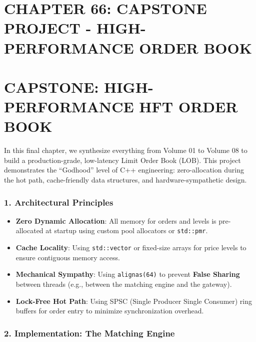 \hypertarget{chapter-66-capstone-project---high-performance-order-book}{%
\section{CHAPTER 66: CAPSTONE PROJECT - HIGH-PERFORMANCE ORDER
BOOK}\label{chapter-66-capstone-project---high-performance-order-book}}

\hypertarget{capstone-high-performance-hft-order-book}{%
\section{CAPSTONE: HIGH-PERFORMANCE HFT ORDER
BOOK}\label{capstone-high-performance-hft-order-book}}

In this final chapter, we synthesize everything from Volume 01 to Volume
08 to build a production-grade, low-latency Limit Order Book (LOB). This
project demonstrates the ``Godhood'' level of C++ engineering:
zero-allocation during the hot path, cache-friendly data structures, and
hardware-sympathetic design.

\hypertarget{architectural-principles}{%
\subsubsection{1. Architectural
Principles}\label{architectural-principles}}

\begin{itemize}
\tightlist
\item
  \textbf{Zero Dynamic Allocation}: All memory for orders and levels is
  pre-allocated at startup using custom pool allocators or
  \passthrough{\lstinline!std::pmr!}.
\item
  \textbf{Cache Locality}: Using \passthrough{\lstinline!std::vector!}
  or fixed-size arrays for price levels to ensure contiguous memory
  access.
\item
  \textbf{Mechanical Sympathy}: Using
  \passthrough{\lstinline!alignas(64)!} to prevent \textbf{False
  Sharing} between threads (e.g., between the matching engine and the
  gateway).
\item
  \textbf{Lock-Free Hot Path}: Using SPSC (Single Producer Single
  Consumer) ring buffers for order entry to minimize synchronization
  overhead.
\end{itemize}

\hypertarget{implementation-the-matching-engine}{%
\subsubsection{2. Implementation: The Matching
Engine}\label{implementation-the-matching-engine}}

